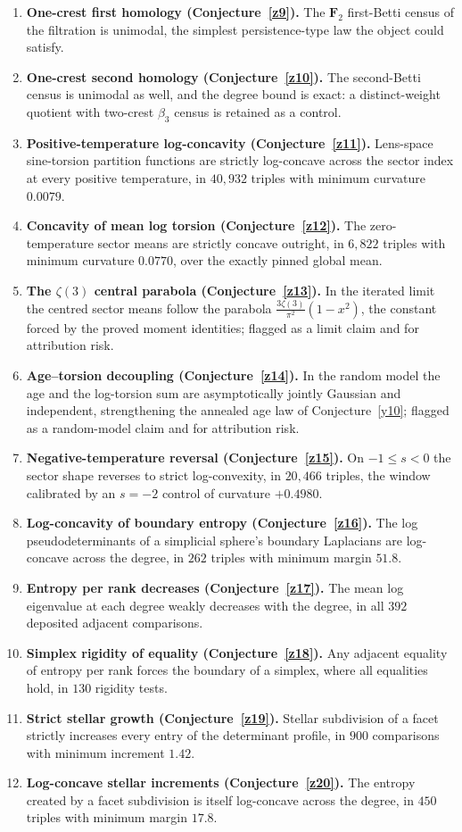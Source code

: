 \documentclass[11pt]{article}
\theoremstyle{definition}
\begin{document}
\begin{enumerate}
\item \textbf{One-crest first homology (Conjecture~\ref{z9}).}  The $\mathbf F_2$ first-Betti census of the filtration is unimodal, the simplest persistence-type law the object could satisfy.
\item \textbf{One-crest second homology (Conjecture~\ref{z10}).}  The second-Betti census is unimodal as well, and the degree bound is exact: a distinct-weight quotient with two-crest $\beta_3$ census is retained as a control.
\item \textbf{Positive-temperature log-concavity (Conjecture~\ref{z11}).}  Lens-space sine-torsion partition functions are strictly log-concave across the sector index at every positive temperature, in $40{,}932$ triples with minimum curvature $0.0079$.
\item \textbf{Concavity of mean log torsion (Conjecture~\ref{z12}).}  The zero-temperature sector means are strictly concave outright, in $6{,}822$ triples with minimum curvature $0.0770$, over the exactly pinned global mean.
\item \textbf{The $\zeta(3)$ central parabola (Conjecture~\ref{z13}).}  In the iterated limit the centred sector means follow the parabola $\tfrac{3\zeta(3)}{\pi^2}(1-x^2)$, the constant forced by the proved moment identities; flagged as a limit claim and for attribution risk.
\item \textbf{Age--torsion decoupling (Conjecture~\ref{z14}).}  In the random model the age and the log-torsion sum are asymptotically jointly Gaussian and independent, strengthening the annealed age law of Conjecture~\ref{y10}; flagged as a random-model claim and for attribution risk.
\item \textbf{Negative-temperature reversal (Conjecture~\ref{z15}).}  On $-1\le s<0$ the sector shape reverses to strict log-convexity, in $20{,}466$ triples, the window calibrated by an $s=-2$ control of curvature $+0.4980$.
\item \textbf{Log-concavity of boundary entropy (Conjecture~\ref{z16}).}  The log pseudodeterminants of a simplicial sphere's boundary Laplacians are log-concave across the degree, in $262$ triples with minimum margin $51.8$.
\item \textbf{Entropy per rank decreases (Conjecture~\ref{z17}).}  The mean log eigenvalue at each degree weakly decreases with the degree, in all $392$ deposited adjacent comparisons.
\item \textbf{Simplex rigidity of equality (Conjecture~\ref{z18}).}  Any adjacent equality of entropy per rank forces the boundary of a simplex, where all equalities hold, in $130$ rigidity tests.
\item \textbf{Strict stellar growth (Conjecture~\ref{z19}).}  Stellar subdivision of a facet strictly increases every entry of the determinant profile, in $900$ comparisons with minimum increment $1.42$.
\item \textbf{Log-concave stellar increments (Conjecture~\ref{z20}).}  The entropy created by a facet subdivision is itself log-concave across the degree, in $450$ triples with minimum margin $17.8$.
\end{enumerate}
\end{document}
